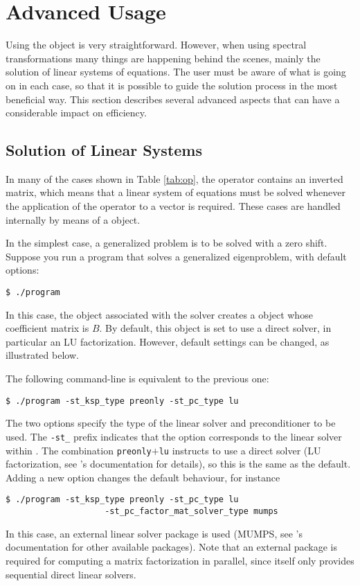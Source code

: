 \section{Advanced Usage}

Using the  object is very straightforward. However, when using spectral transformations many things are happening behind the scenes, mainly the solution of linear systems of equations. The user must be aware of what is going on in each case, so that it is possible to guide the solution process in the most beneficial way. This section describes several advanced aspects that can have a considerable impact on efficiency.

\subsection{Solution of Linear Systems}
\label{sec:lin}

	In many of the cases shown in Table \ref{tab:op}, the operator contains an inverted matrix, which means that a linear system of equations must be solved whenever the application of the operator to a vector is required. These cases are handled internally by means of a  object.

	In the simplest case, a generalized problem is to be solved with a zero shift. Suppose you run a program that solves a generalized eigenproblem, with default options:
\begin{Verbatim}[fontsize=\small]
	$ ./program
\end{Verbatim}
In this case, the  object associated with the  solver creates a  object whose coefficient matrix is $B$. By default, this  object is set to use a direct solver, in particular an LU factorization. However, default settings can be changed, as illustrated below.

	The following command-line is equivalent to the previous one:
\begin{Verbatim}[fontsize=\small]
	$ ./program -st_ksp_type preonly -st_pc_type lu
\end{Verbatim}
The two options specify the type of the linear solver and preconditioner to be used. The \Verb!-st_! prefix indicates that the option corresponds to the linear solver within . The combination \texttt{preonly}$+$\texttt{lu} instructs to use a direct solver (LU factorization, see \petsc's documentation for details), so this is the same as the default. Adding a new option changes the default behaviour, for instance
\begin{Verbatim}[fontsize=\small]
	$ ./program -st_ksp_type preonly -st_pc_type lu
                    -st_pc_factor_mat_solver_type mumps
\end{Verbatim}
In this case, an external linear solver package is used (MUMPS, see \petsc's documentation for other available packages). Note that an external package is required for computing a matrix factorization in parallel, since \petsc itself only provides sequential direct linear solvers.

